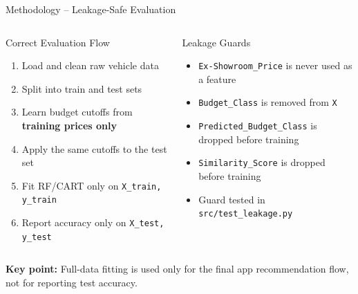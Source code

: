 \documentclass[aspectratio=169]{beamer}
\begin{document}
\begin{frame}{Methodology -- Leakage-Safe Evaluation}
  \begin{columns}[t]
      \begin{block}{Correct Evaluation Flow}
        \begin{enumerate}
          \item Load and clean raw vehicle data
          \item Split into train and test sets
          \item Learn budget cutoffs from \textbf{training prices only}
          \item Apply the same cutoffs to the test set
          \item Fit RF/CART only on \texttt{X\_train, y\_train}
          \item Report accuracy only on \texttt{X\_test, y\_test}
        \end{enumerate}
      \end{block}
      \begin{alertblock}{Leakage Guards}
        \begin{itemize}
          \item \texttt{Ex-Showroom\_Price} is never used as a feature
          \item \texttt{Budget\_Class} is removed from \texttt{X}
          \item \texttt{Predicted\_Budget\_Class} is dropped before training
          \item \texttt{Similarity\_Score} is dropped before training
          \item Guard tested in \texttt{src/test\_leakage.py}
        \end{itemize}
      \end{alertblock}
  \end{columns}
  \vspace{0.4em}
  \small\textbf{Key point:} Full-data fitting is used only for the final app recommendation flow, not for reporting test accuracy.
\end{frame}
\end{document}
